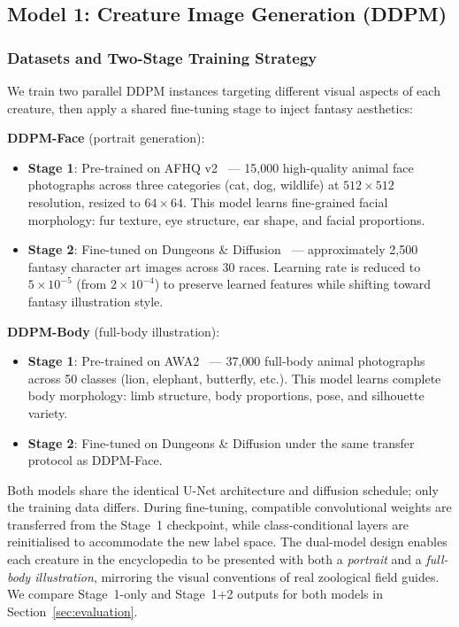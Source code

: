 \documentclass[12pt,a4paper]{article}
\begin{document}
\subsection{Model 1: Creature Image Generation (DDPM)}

\subsubsection{Datasets and Two-Stage Training Strategy}

We train two parallel DDPM instances targeting different visual aspects of each creature, then apply a shared fine-tuning stage to inject fantasy aesthetics:

\textbf{DDPM-Face} (portrait generation):
\begin{itemize}
    \item \textbf{Stage 1}: Pre-trained on AFHQ v2~\cite{choi2020starganv2} --- 15{,}000 high-quality animal face photographs across three categories (cat, dog, wildlife) at $512 \times 512$ resolution, resized to $64 \times 64$. This model learns fine-grained facial morphology: fur texture, eye structure, ear shape, and facial proportions.
    \item \textbf{Stage 2}: Fine-tuned on Dungeons \& Diffusion~\cite{dungeons_diffusion} --- approximately 2{,}500 fantasy character art images across 30 races. Learning rate is reduced to $5 \times 10^{-5}$ (from $2 \times 10^{-4}$) to preserve learned features while shifting toward fantasy illustration style.
\end{itemize}

\textbf{DDPM-Body} (full-body illustration):
\begin{itemize}
    \item \textbf{Stage 1}: Pre-trained on AWA2~\cite{xian2018zero} --- 37{,}000 full-body animal photographs across 50 classes (lion, elephant, butterfly, etc.). This model learns complete body morphology: limb structure, body proportions, pose, and silhouette variety.
    \item \textbf{Stage 2}: Fine-tuned on Dungeons \& Diffusion under the same transfer protocol as DDPM-Face.
\end{itemize}

Both models share the identical U-Net architecture and diffusion schedule; only the training data differs. During fine-tuning, compatible convolutional weights are transferred from the Stage~1 checkpoint, while class-conditional layers are reinitialised to accommodate the new label space. The dual-model design enables each creature in the encyclopedia to be presented with both a \emph{portrait} and a \emph{full-body illustration}, mirroring the visual conventions of real zoological field guides. We compare Stage~1-only and Stage~1+2 outputs for both models in Section~\ref{sec:evaluation}.
\end{document}
